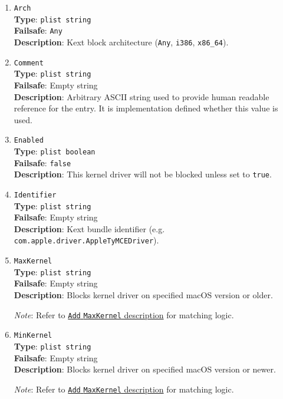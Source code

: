 \documentclass[]{article}
\begin{document}
\begin{enumerate}
\item
  \texttt{Arch}\\
  \textbf{Type}: \texttt{plist\ string}\\
  \textbf{Failsafe}: \texttt{Any}\\
  \textbf{Description}: Kext block architecture (\texttt{Any}, \texttt{i386}, \texttt{x86\_64}).

\item
  \texttt{Comment}\\
  \textbf{Type}: \texttt{plist\ string}\\
  \textbf{Failsafe}: Empty string\\
  \textbf{Description}: Arbitrary ASCII string used to provide human readable
  reference for the entry. It is implementation defined whether this value is
  used.

\item
  \texttt{Enabled}\\
  \textbf{Type}: \texttt{plist\ boolean}\\
  \textbf{Failsafe}: \texttt{false}\\
  \textbf{Description}: This kernel driver will not be blocked unless set to
  \texttt{true}.

\item
  \texttt{Identifier}\\
  \textbf{Type}: \texttt{plist\ string}\\
  \textbf{Failsafe}: Empty string\\
  \textbf{Description}: Kext bundle identifier
    (e.g. \texttt{com.apple.driver.AppleTyMCEDriver}).

\item
  \texttt{MaxKernel}\\
  \textbf{Type}: \texttt{plist\ string}\\
  \textbf{Failsafe}: Empty string\\
  \textbf{Description}: Blocks kernel driver on specified macOS version or older.

  \emph{Note}: Refer to \hyperlink{kernmatch}{\texttt{Add} \texttt{MaxKernel} description} for matching logic.

\item
  \texttt{MinKernel}\\
  \textbf{Type}: \texttt{plist\ string}\\
  \textbf{Failsafe}: Empty string\\
  \textbf{Description}: Blocks kernel driver on specified macOS version or newer.

  \emph{Note}: Refer to \hyperlink{kernmatch}{\texttt{Add} \texttt{MaxKernel} description} for matching logic.

\end{enumerate}
\end{document}
